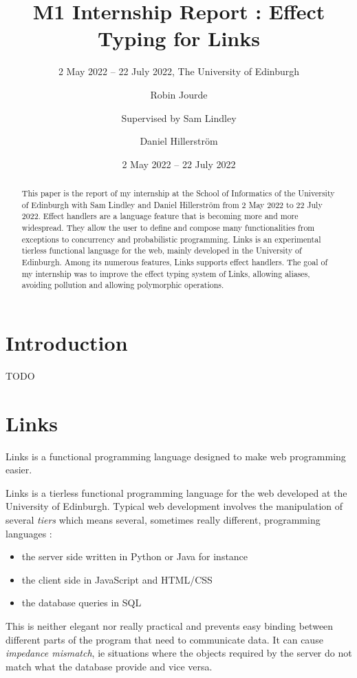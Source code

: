 \documentclass[11pt, nonacm=true, language=french, language=english]{acmart}
\author[R. Jourde]{Robin Jourde}
\affiliation{%
  \institution{École Normale Supérieure de Lyon}%
  \country{France}%
}
\author{Supervised by Sam Lindley}
\author{Daniel Hillerström}
\affiliation{%
  \institution{The University of Edinburgh}%
  \country{United Kingdom}%
}
\title[M1 Internship Report]{M1 Internship Report : Effect Typing for Links}
\subtitle{2 May 2022 -- 22 July 2022, The University of Edinburgh}
\date{2 May 2022 -- 22 July 2022}
\begin{document}
\begin{abstract}
  This paper is the report of my internship at the School of Informatics of the University of Edinburgh with Sam Lindley and Daniel Hillerström from 2 May 2022 to 22 July 2022.
  Effect handlers are a language feature that is becoming more and more widespread. They allow the user to define and compose many functionalities from exceptions to concurrency and probabilistic programming.
  Links is an experimental tierless functional language for the web, mainly developed in the University of Edinburgh. Among its numerous features, Links supports effect handlers.
  The goal of my internship was to improve the effect typing system of Links, allowing aliases, avoiding pollution and allowing polymorphic operations.
\end{abstract}


\maketitle

\tableofcontents

\newpage

\section{Introduction}

TODO

\section{Links}

\begin{fquote}
 Links is a functional programming language designed to make web programming easier.
\end{fquote}

Links \citep{links} is a tierless functional programming language for the web developed at the University of Edinburgh. Typical web development involves the manipulation of several \emph{tiers} which means several, sometimes really different, programming languages :
\begin{itemize}
  \item the server side written in Python or Java for instance
  \item the client side in JavaScript and HTML/CSS
  \item the database queries in SQL
\end{itemize}
This is neither elegant nor really practical and prevents easy binding between different parts of the program that need to communicate data. It can cause \emph{impedance mismatch}, ie situations where the objects required by the server do not match what the database provide and vice versa.
\end{document}
